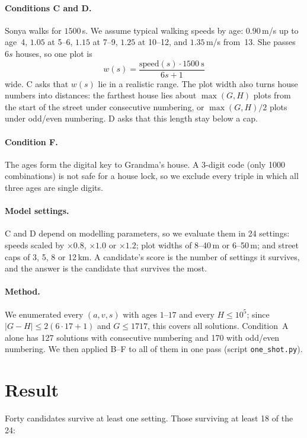\documentclass[11pt,a4paper]{article}
\newcommand{\tx}[1]{\texttt{#1}}
\begin{document}
\paragraph{Conditions C and D.} Sonya walks for $1500$\,s. We assume typical walking speeds by age: $0.90$\,m/s
up to age~4, $1.05$ at 5--6, $1.15$ at 7--9, $1.25$ at 10--12, and $1.35$\,m/s from~13. She passes $6s$ houses,
so one plot is
\[
w(s)=\frac{\text{speed}(s)\cdot 1500\ \text{s}}{6s+1}
\]
wide. C asks that $w(s)$ lie in a realistic range. The plot width also turns house numbers into distances: the
farthest house lies about $\max(G,H)$ plots from the start of the street under consecutive numbering, or
$\max(G,H)/2$ plots under odd/even numbering. D asks that this length stay below a cap.

\paragraph{Condition F.} The ages form the digital key to Grandma's house. A 3-digit code (only 1000 combinations)
is not safe for a house lock, so we exclude every triple in which all three ages are single digits.

\paragraph{Model settings.} C and D depend on modelling parameters, so we evaluate them in 24 settings: speeds
scaled by $\times0.8$, $\times1.0$ or $\times1.2$; plot widths of 8--40\,m or 6--50\,m; and street caps of 3, 5,
8 or 12\,km. A candidate's score is the number of settings it survives, and the answer is the candidate that
survives the most.

\paragraph{Method.} We enumerated every $(a,v,s)$ with ages $1$--$17$ and every $H\le10^5$; since
$|G-H|\le2(6\cdot17+1)$ and $G\le1717$, this covers all solutions. Condition~A alone has 127 solutions with
consecutive numbering and 170 with odd/even numbering. We then applied B--F to all of them in one pass (script
\tx{one\_shot.py}).

\section{Result}

Forty candidates survive at least one setting. Those surviving at least 18 of the 24:
\end{document}
